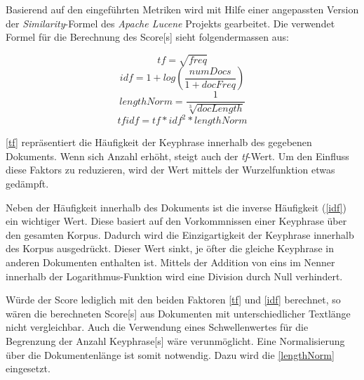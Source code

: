 Basierend auf den eingeführten Metriken wird mit Hilfe einer angepassten Version der \textit{Similarity}-Formel\footnotemark {} des \textit{Apache Lucene} Projekts gearbeitet. Die verwendet Formel für die Berechnung des \gls{Score}[s] sieht folgendermassen aus:

\begin{equation}\label{tf}
tf = \sqrt{freq} 
\end{equation}
\begin{equation}\label{idf}
idf  =  1 +log( \frac{numDocs}{1 + docFreq})
\end{equation}
\begin{equation}\label{lengthNorm}
lengthNorm =\frac{1}{\sqrt[3]{docLength}} 
\end{equation}
\begin{equation}\label{tfidf}
tfidf = tf * idf^2 * lengthNorm
\end{equation}

\autoref{tf} repräsentiert die Häufigkeit der \gls{Keyphrase} innerhalb des gegebenen Dokuments. Wenn sich Anzahl erhöht, steigt auch der \textit{tf}-Wert. Um den Einfluss diese Faktors zu reduzieren, wird der Wert mittels der Wurzelfunktion etwas gedämpft.

Neben der Häufigkeit innerhalb des Dokuments ist die inverse Häu\-fig\-keit (\autoref{idf}) ein wichtiger Wert. Diese basiert auf den Vorkommnissen einer \gls{Keyphrase} über den gesamten Korpus. Dadurch wird die Einzigartigkeit der \gls{Keyphrase} innerhalb des Korpus ausgedrückt. Dieser Wert sinkt, je öfter die gleiche \gls{Keyphrase} in anderen Dokumenten enthalten ist. Mittels der Addition von eins im Nenner innerhalb der Logarithmus-Funktion wird eine Division durch Null verhindert. 



Würde der \gls{Score} lediglich mit den beiden Faktoren \autoref{tf} und \autoref{idf} berechnet, so wären die berechneten \gls{Score}[s] aus Dokumenten mit unterschiedlicher Textlänge nicht vergleichbar. Auch die Verwendung eines Schwellenwertes für die Begrenzung der Anzahl \gls{Keyphrase}[s] wäre verunmöglicht. Eine Normalisierung über die Dokumentenlänge ist somit notwendig. Dazu wird die \autoref{lengthNorm} eingesetzt.

